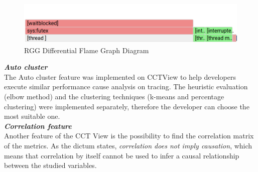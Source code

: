  \begin{figure}[h]
  \centering
    \includegraphics[width=1.0\textwidth]{figures/framegraph.png}
  \caption{RGG Differential Flame Graph Diagram}
  \label{fig:flame}
\end{figure}

\textbf{\textit{Auto cluster}}\\
The Auto cluster feature was implemented on CCTView to help developers execute similar performance cause analysis on tracing. The heuristic evaluation (elbow method) and the clustering techniques (k-means and percentage clustering) were implemented separately, therefore the developer can choose the most suitable one.\\
    
\textbf{\textit{Correlation feature}}\\
Another feature of the CCT View is the possibility to find the correlation matrix of the metrics. 
As the dictum states, \textit{correlation does not imply causation}, which means that correlation by itself cannot be used to infer a causal relationship between the studied variables.
    